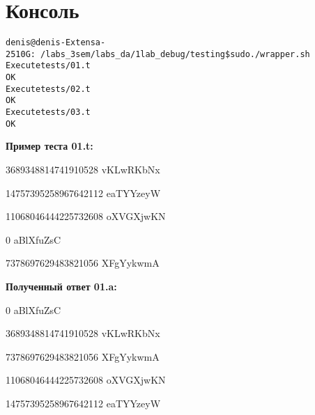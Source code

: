 \pagebreak

\section{Консоль}
\begin{alltt}

denis@denis-Extensa-2510G:~/labs_3sem/labs_da/1lab_debug/testing\$ sudo ./wrapper.sh 
Execute tests/01.t
OK
Execute tests/02.t
OK
Execute tests/03.t
OK
\end{alltt}

\textbf{Пример теста 01.t:}

3689348814741910528	vKLwRKbNx

14757395258967642112	eaTYYzeyW

11068046444225732608	oXVGXjwKN

0	aBlXfuZsC

7378697629483821056	XFgYykwmA




\textbf{Полученный ответ 01.a:}

0	aBlXfuZsC

3689348814741910528	vKLwRKbNx

7378697629483821056	XFgYykwmA

11068046444225732608	oXVGXjwKN

14757395258967642112	eaTYYzeyW

\pagebreak

